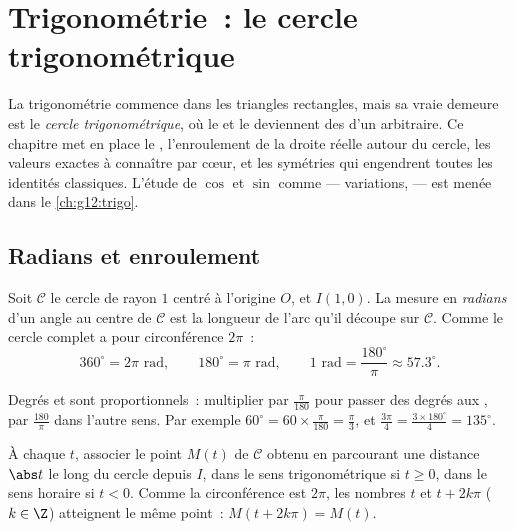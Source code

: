 \chapter{Trigonométrie~: le cercle trigonométrique}\label{ch:g11:trigo}

La trigonométrie commence dans les triangles rectangles, mais sa vraie
demeure est le \emph{cercle trigonométrique}, où le  et le 
deviennent des  d'un  arbitraire. Ce chapitre met en
place le , l'enroulement de la droite réelle autour du cercle, les
valeurs exactes à connaître par cœur, et les symétries qui engendrent
toutes les identités classiques. L'étude de $\cos$ et $\sin$ comme
 --- variations,  --- est menée dans le
\cref{ch:g12:trigo}.

\section{Radians et enroulement}

\begin{definition}[Radian]\label{def:g11:trigo:radian}
Soit $\mathcal C$ le cercle de rayon $1$ centré à l'origine $O$, et
$I(1, 0)$. La mesure en \emph{radians} d'un angle au centre
de $\mathcal C$ est la longueur de l'arc qu'il découpe sur $\mathcal C$.
Comme le cercle complet a pour circonférence $2\pi$~:
\[
360^\circ = 2\pi \text{ rad},
\qquad
180^\circ = \pi \text{ rad},
\qquad
1 \text{ rad} = \frac{180^\circ}{\pi} \approx 57.3^\circ .
\]
\end{definition}

\begin{method}[Convertir]\label{met:g11:trigo:convert}
Degrés et  sont proportionnels~: multiplier par $\frac{\pi}{180}$
pour passer des degrés aux , par $\frac{180}{\pi}$ dans l'autre
sens. Par exemple $60^\circ = 60 \times \frac{\pi}{180} = \frac{\pi}{3}$,
et $\frac{3\pi}{4} = \frac{3 \times 180^\circ}{4} = 135^\circ$.
\end{method}

\begin{definition}\label{def:g11:trigo:winding}
À chaque  $t$, associer le point $M(t)$ de $\mathcal C$
obtenu en parcourant une distance $\abs t$ le long du cercle depuis $I$,
dans le sens trigonométrique si $t \geq 0$, dans le sens horaire si
$t < 0$. Comme la circonférence est $2\pi$, les nombres $t$ et
$t + 2k\pi$ ($k \in \Z$) atteignent le même point~:
$M(t + 2k\pi) = M(t)$.
\end{definition}

